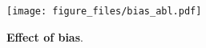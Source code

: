 \begin{figure}[t]
    \small\centering
    \texttt{[image: figure\_files/bias\_abl.pdf]}
    \caption{
    \textbf{Effect of bias}. }
    \label{fig:bias_abl}
    \vspace{-10pt}
\end{figure}